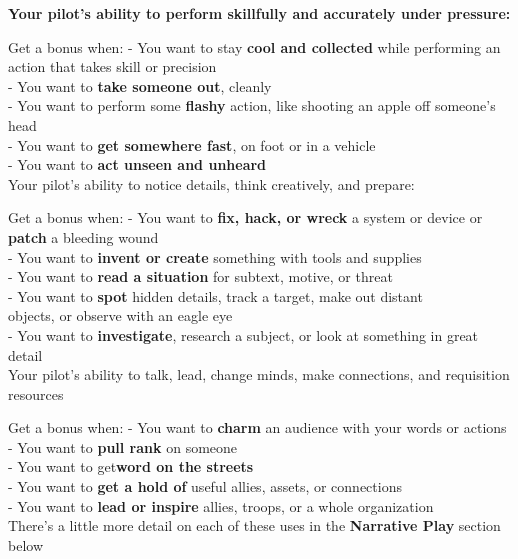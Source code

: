 \textbf{Your pilot’s ability to perform skillfully and accurately under pressure:}

Get a bonus when:
- You want to stay \textbf{cool and collected} while performing an action that
takes skill or precision\\
- You want to \textbf{take someone out}, cleanly\\
- You want to perform some \textbf{flashy} action, like shooting an apple off
someone’s head\\
- You want to \textbf{get somewhere fast}, on foot or in a vehicle\\
- You want to \textbf{act unseen and unheard}\\ 

Your pilot’s ability to notice details, think creatively, and prepare:

Get a bonus when:
- You want to \textbf{fix, hack, or wreck} a system or device or \textbf{patch}
a bleeding wound\\
- You want to \textbf{invent or create} something with tools and supplies\\
- You want to \textbf{read a situation} for subtext, motive, or threat\\
- You want to \textbf{spot} hidden details, track a target, make out distant\\
objects, or observe with an eagle eye\\
- You want to \textbf{investigate}, research a subject, or look at something in great detail\\

Your pilot’s ability to talk, lead, change minds, make connections, and requisition
resources

Get a bonus when:
- You want to \textbf{charm} an audience with your words or actions\\
- You want to \textbf{pull rank} on someone\\
- You want to get\textbf{word on the streets}\\
- You want to \textbf{get a hold of} useful allies, assets, or connections\\
- You want to \textbf{lead or inspire} allies, troops, or a whole organization\\

There’s a little more detail on each of these uses in the \textbf{Narrative Play} section below